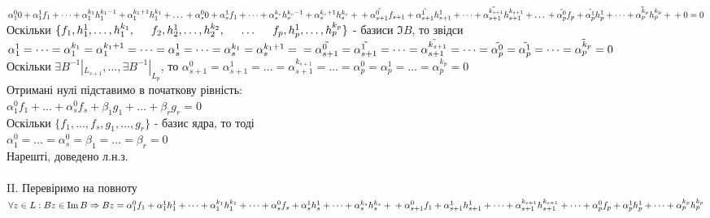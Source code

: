 \documentclass[a4paper, 14pt]{extarticle}
\begin{document}
$\alpha_1^0 0 + \alpha_1^1 f_1 + \dots + \alpha_1^{k_1}h_1^{k_1-1} + \alpha_1^{k_1+1} h_1^{k_1} + \dots \\
+\alpha_s^0 0 + \alpha_s^1 f_1 + \dots + \alpha_s^{k_s}h_s^{k_s-1} + \alpha_s^{k_s+1} h_s^{k_s} + \\
+\tilde{\alpha_{s+1}^0} f_{s+1} + \tilde{\alpha_{s+1}^1} h_{s+1}^1 + \dots + \tilde{\alpha_{s+1}^{k_{s+1}}} h_{s+1}^{k_{s+1}} + \dots \\
+\tilde{\alpha_p^0} f_p + \tilde{\alpha_p^1} h_p^1 + \dots + \tilde{\alpha_p^{k_p}}h_p^{k_p} + \\
+ 0 = 0$\\
Оскільки $\{f_1, h_1^1, \dots ,h_1^{k_1}, \hspace{0.5cm} f_2, h_2^1, \dots, h_2^{k_2}, \hspace{0.5cm} \dots \hspace{0.5cm} f_p, h_p^{1}, \dots, h_p^{k_p}\}$ - базиси $\Im B$, то звідси\\
$\alpha_1^1 = \dots = \alpha_1^{k_1} = \alpha_1^{k_1+1} = \dots = \alpha_s^1 = \dots = \alpha_s^{k_1} = \alpha_s^{k_1+1} = \\
=\tilde{\alpha_{s+1}^0} = \tilde{\alpha_{s+1}^1} = \dots = \tilde{\alpha_{s+1}^{k_{s+1}}} = \dots = \tilde{\alpha_p^0} = \tilde{\alpha_p^1} = \dots = \tilde{\alpha_p^{k_p}} = 0$\\
Оскільки $\exists B^{-1}|_{L_{s+1}}, \dots, \exists B^{-1}|_{L_{p}}$, то
$\alpha_{s+1}^0 = \alpha_{s+1}^1 = \dots = \alpha_{s+1}^{k_{s+1}} = \dots = \alpha_{p}^0 = \alpha_{p}^1 = \dots = \alpha_{p}^{k_{p}} = 0$\\
Отримані нулі підставимо в початкову рівність:\\
$\alpha_1^0 f_1 + \dots + \alpha_s^0 f_s + \beta_1 g_1 + \dots + \beta_r g_r = 0$\\
Оскільки $\{f_1, \dots, f_s, g_1, \dots, g_r\}$ - базис ядра, то тоді\\
$\alpha_1^0 = \dots = \alpha_s^0 = \beta_1 = \dots = \beta_r = 0$\\
Нарешті, доведено л.н.з.\\
\\
II. Перевіримо на повноту\\
$\forall z \in L: Bz \in \Im B \Rightarrow \\ Bz = \alpha_1^0 f_1 + \alpha_1^1 h_1^1 + \dots + \alpha_1^{k_1}h_1^{k_1} + \dots + \alpha_s^0 f_s + \alpha_s^1 h_s^1 + \dots + \alpha_s^{k_s} h_s^{k_s} + \\ + \alpha_{s+1}^0 f_1 + \alpha_{s+1}^1 h_{s+1}^1 + \dots + \alpha_{s+1}^{k_{s+1}}h_{s+1}^{k_{s+1}} + \dots + \alpha_p^0 f_p + \alpha_p^1 h_p^1 + \dots + \alpha_p^{k_p}h_p^{k_p}$\\
\end{document}
